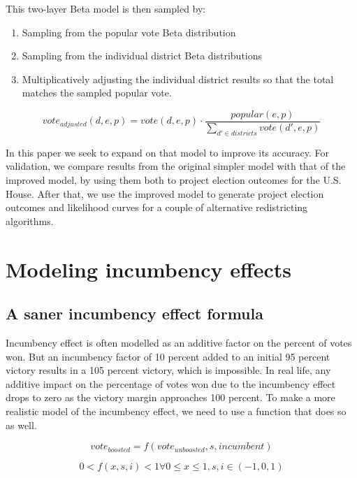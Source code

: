 \documentclass[preprint,12pt]{article}
\begin{document}
This two-layer Beta model is then sampled by:

\begin{enumerate}
\item Sampling from the popular vote Beta distribution
\item Sampling from the individual district Beta distributions
\item Multiplicatively adjusting the individual district results so that the total matches the sampled popular vote.
\end{enumerate}


\begin{equation}
vote_{adjusted}(d,e,p) = 
vote(d,e,p) \cdot \frac{popular(e,p) }{ \sum_{d' \in districts}{vote(d',e,p)}} 
\end{equation}

In this paper we seek to expand on that model to improve its accuracy.  For validation, we compare results from the original simpler model with that of the improved model, by using them both to project election outcomes for the U.S. House.  After that, we use the improved model to generate project election outcomes and likelihood curves for a couple of alternative redistricting algorithms.

\section{Modeling incumbency effects}


\subsection{A saner incumbency effect formula}

Incumbency effect is often modelled as an additive factor on the percent of votes won.  But an incumbency factor of 10 percent added to an initial 95 percent victory results in a 105 percent victory, which is impossible.   In real life, any additive impact on the percentage of votes won due to the incumbency effect drops to zero as the victory margin approaches 100 percent.  To make a more realistic model of the incumbency effect, we need to use a function that does so as well.

\begin{equation}vote_{boosted} = f(vote_{unb
oosted}, s, incumbent)
\end{equation}

\begin{equation}
0 < f(x,s,i) < 1 \forall 0 \le  x \le 1,s,i \in ( -1,0,1)
\end{equation}
\end{document}
